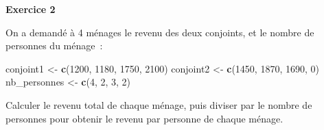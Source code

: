 \documentclass[12pt,]{book}
\newenvironment{Shaded}{\begin{snugshade}}{\end{snugshade}}
\newcommand{\DecValTok}[1]{\textcolor[rgb]{0.06,0.06,0.06}{#1}}
\newcommand{\KeywordTok}[1]{\textcolor[rgb]{0.27,0.27,0.27}{\textbf{#1}}}
\newcommand{\NormalTok}[1]{#1}
\newcommand{\OperatorTok}[1]{\textcolor[rgb]{0.43,0.43,0.43}{\textbf{#1}}}
\newcommand{\StringTok}[1]{\textcolor[rgb]{0.5,0.5,0.5}{#1}}
\begin{document}

\textbf{Exercice 2}

On a demandé à 4 ménages le revenu des deux conjoints, et le nombre de personnes du ménage~:

\begin{Shaded}
\begin{Highlighting}[]
\NormalTok{conjoint1 <-}\StringTok{ }\KeywordTok{c}\NormalTok{(}\DecValTok{1200}\NormalTok{, }\DecValTok{1180}\NormalTok{, }\DecValTok{1750}\NormalTok{, }\DecValTok{2100}\NormalTok{)}
\NormalTok{conjoint2 <-}\StringTok{ }\KeywordTok{c}\NormalTok{(}\DecValTok{1450}\NormalTok{, }\DecValTok{1870}\NormalTok{, }\DecValTok{1690}\NormalTok{, }\DecValTok{0}\NormalTok{)}
\NormalTok{nb_personnes <-}\StringTok{ }\KeywordTok{c}\NormalTok{(}\DecValTok{4}\NormalTok{, }\DecValTok{2}\NormalTok{, }\DecValTok{3}\NormalTok{, }\DecValTok{2}\NormalTok{)}
\end{Highlighting}
\end{Shaded}

Calculer le revenu total de chaque ménage, puis diviser par le nombre de personnes pour obtenir le revenu par personne de chaque ménage.

\end{document}
